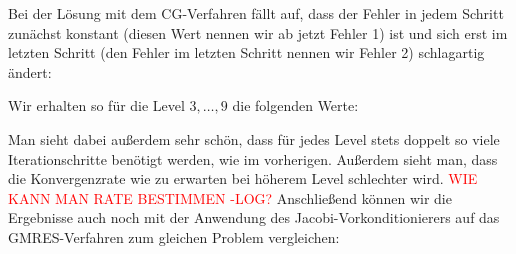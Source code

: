 \documentclass[12pt,a4paper]{scrartcl}
\numberwithin{equation}{section}
\begin{document}
Bei der Lösung mit dem CG-Verfahren fällt auf, dass der Fehler in jedem Schritt zunächst konstant (diesen Wert nennen wir ab jetzt Fehler 1) ist und sich erst im letzten Schritt (den Fehler im letzten Schritt nennen wir Fehler 2) schlagartig ändert:

\begin{figure}[H]
	\centering
\end{figure}

Wir erhalten so für die Level $3, \dots,9$ die folgenden Werte:

\begin{figure}[H]
	\centering
\end{figure}

Man sieht dabei außerdem sehr schön, dass für jedes Level stets doppelt so viele Iterationschritte benötigt werden, wie im vorherigen. Außerdem sieht man, dass die Konvergenzrate wie zu erwarten bei höherem Level schlechter wird. 
\textcolor{red}{WIE KANN MAN RATE BESTIMMEN -LOG?}
Anschließend können wir die Ergebnisse auch noch mit der Anwendung des Jacobi-Vorkonditionierers auf das GMRES-Verfahren zum gleichen Problem vergleichen:

\begin{figure}[H]
	\centering
\end{figure}
\end{document}
